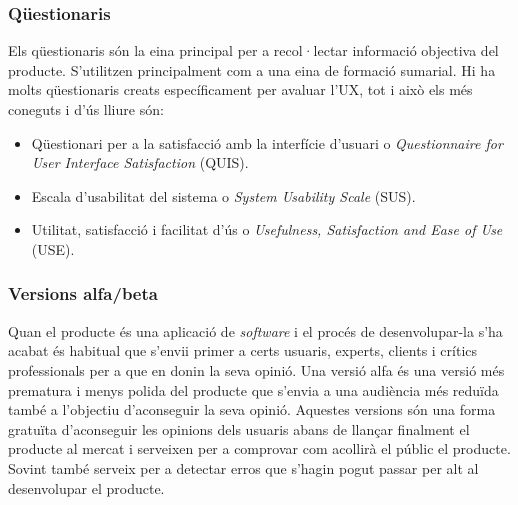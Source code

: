 \subsubsection{Qüestionaris}
Els qüestionaris són la eina principal per a recol·lectar informació objectiva del producte. S'utilitzen principalment com a una eina de formació sumarial. Hi ha molts qüestionaris creats específicament per avaluar l'\ac{UX}, tot i això els més coneguts i d'ús lliure són:
\begin{itemize}
\item Qüestionari per a la satisfacció amb la interfície d'usuari o \textit{Questionnaire for User Interface Satisfaction} (QUIS).
\item Escala d'usabilitat del sistema o \textit{System Usability Scale} (SUS).
\item Utilitat, satisfacció i facilitat d'ús o \textit{Usefulness, Satisfaction and Ease of Use} (USE).
\end{itemize}

\subsubsection{Versions alfa/beta}
Quan el producte és una aplicació de \textit{software} i el procés de desenvolupar-la s'ha acabat és habitual que s'envii primer a certs usuaris, experts, clients i crítics professionals per a que en donin la seva opinió. Una versió alfa és una versió més prematura i menys polida del producte que s'envia a una audiència més reduïda també a l'objectiu d'aconseguir la seva opinió. 
Aquestes versions són una forma gratuïta d'aconseguir les opinions dels usuaris abans de llançar finalment el producte al mercat i serveixen per a comprovar com acollirà el públic el producte. Sovint també serveix per a detectar erros que s'hagin pogut passar per alt al desenvolupar el producte. 




